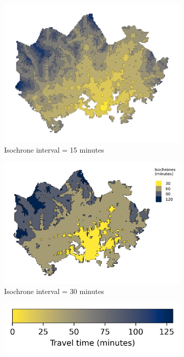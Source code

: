 \begin{figure}[H]
\begin{subfigure}[b]{0.5\textwidth}
		\includegraphics[width=\textwidth]{visual/figures/ttm/isochrone_interval_15}
		\caption{Isochrone interval = 15 minutes}
		\label{fig:interval 15}
	\end{subfigure}%
	\hfill
	\begin{subfigure}[b]{0.5\textwidth}
		\includegraphics[width=\textwidth]{visual/figures/ttm/isochrone_interval_30}
		\caption{Isochrone interval = 30 minutes}
		\label{fig:interval 30}
	\end{subfigure}%
	\hfill
	\begin{subfigure}[b]{0.4\textwidth}
		\includegraphics[width=\textwidth]{visual/figures/ttm/isochrone_cbar}

\end{subfigure}
\end{figure}
